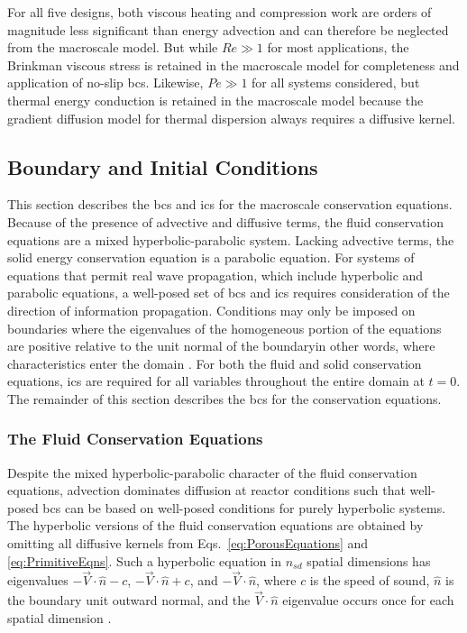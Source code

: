 For all five designs, both viscous heating and compression work are orders of magnitude less significant than energy advection and can therefore be neglected from the macroscale model. But while \(Re\gg1\) for most applications, the Brinkman viscous stress is retained in the macroscale model for completeness and application of no-slip \glspl{bc}. Likewise, \(Pe\gg1\) for all systems considered, but thermal energy conduction is retained in the macroscale model because the gradient diffusion model for thermal dispersion always requires a diffusive kernel.

\subsection{Boundary and Initial Conditions}
\label{sec:BCs}

This section describes the \glspl{bc} and \glspl{ic} for the macroscale conservation equations. Because of the presence of advective and diffusive terms, the fluid conservation equations are a mixed hyperbolic-parabolic system. Lacking advective terms, the solid energy conservation equation is a parabolic equation. For systems of equations that permit real wave propagation, which include hyperbolic and parabolic equations, a well-posed set of \glspl{bc} and \glspl{ic} requires consideration of the direction of information propagation. Conditions may only be imposed on boundaries where the eigenvalues of the homogeneous portion of the equations are positive relative to the unit normal of the boundary\mdash  in other words, where characteristics enter the domain \cite{hirsch}. For both the fluid and solid conservation equations, \glspl{ic} are required for all variables throughout the entire domain at \(t=0\). The remainder of this section describes the \glspl{bc} for the conservation equations.

\subsubsection{The Fluid Conservation Equations}

Despite the mixed hyperbolic-parabolic character of the fluid conservation equations, advection dominates diffusion at reactor conditions such that well-posed \glspl{bc} can be based on well-posed conditions for purely hyperbolic systems. The hyperbolic versions of the fluid conservation equations are obtained by omitting all diffusive kernels from Eqs.\ \eqref{eq:PorousEquations} and \eqref{eq:PrimitiveEqns}. Such a hyperbolic equation in \(n_{sd}\) spatial dimensions has eigenvalues \(-\vec{V}\cdot\hat{n}-c\), \(-\vec{V}\cdot\hat{n}+c\), and \(-\vec{V}\cdot\hat{n}\), where \(c\) is the speed of sound, \(\hat{n}\) is the boundary unit outward normal, and the \(\vec{V}\cdot\hat{n}\) eigenvalue occurs once for each spatial dimension \cite{rohde}. 

